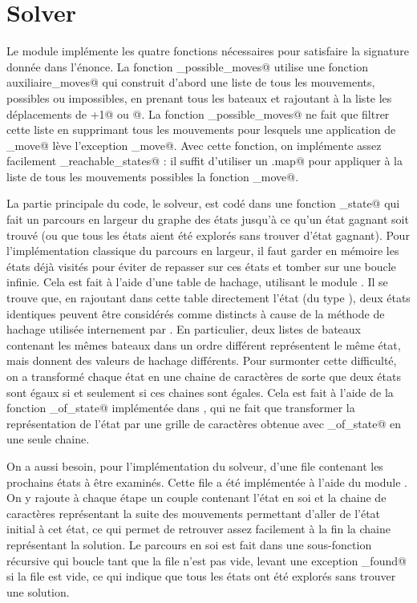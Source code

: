 \documentclass[a4paper,12pt]{article}
\begin{document}
\section{Solver}

Le module \verb@Solver@ implémente les quatre fonctions nécessaires pour satisfaire la signature donnée dans l'énonce. La fonction \verb@all_possible_moves@ utilise une fonction auxiliaire\verb@all_moves@ qui construit d'abord une liste de tous les mouvements, possibles ou impossibles, en prenant tous les bateaux et rajoutant à la liste les déplacements de \verb@+1@ ou @. La fonction \verb@all_possible_moves@ ne fait que filtrer cette liste en supprimant tous les mouvements pour lesquels une application de \verb@apply_move@ lève l'exception \verb@Cannot_move@. Avec cette fonction, on implémente assez facilement \verb@all_reachable_states@ : il suffit d'utiliser un \verb@List.map@ pour appliquer à la liste de tous les mouvements possibles la fonction \verb@apply_move@.

La partie principale du code, le solveur, est codé dans une fonction \verb@solve_state@ qui fait un parcours en largeur du graphe des états jusqu'à ce qu'un état gagnant soit trouvé (ou que tous les états aient été explorés sans trouver d'état gagnant). Pour l'implémentation classique du parcours en largeur, il faut garder en mémoire les états déjà visités pour éviter de repasser sur ces états et tomber sur une boucle infinie. Cela est fait à l'aide d'une table de hachage, utilisant le module \verb@Hashtbl@. Il se trouve que, en rajoutant dans cette table directement l'état (du type \verb@state@), deux états identiques peuvent être considérés comme distincts à cause de la méthode de hachage utilisée internement par \verb@Hashtbl@. En particulier, deux listes de bateaux contenant les mêmes bateaux dans un ordre différent représentent le même état, mais donnent des valeurs de hachage différents. Pour surmonter cette difficulté, on a transformé chaque état en une chaine de caractères de sorte que deux états sont égaux si et seulement si ces chaines sont égales. Cela est fait à l'aide de la fonction \verb@string_of_state@ implémentée dans \verb@Port@, qui ne fait que transformer la représentation de l'état par une grille de caractères obtenue avec \verb@grid_of_state@ en une seule chaine.

On a aussi besoin, pour l'implémentation du solveur, d'une file contenant les prochains états à être examinés. Cette file a été implémentée à l'aide du module \verb@Queue@. On y rajoute à chaque étape un couple contenant l'état en soi et la chaine de caractères représentant la suite des mouvements permettant d'aller de l'état initial à cet état, ce qui permet de retrouver assez facilement à la fin la chaine représentant la solution. Le parcours en soi est fait dans une sous-fonction récursive qui boucle tant que la file n'est pas vide, levant une exception \verb@Not_found@ si la file est vide, ce qui indique que tous les états ont été explorés sans trouver une solution.
\end{document}

